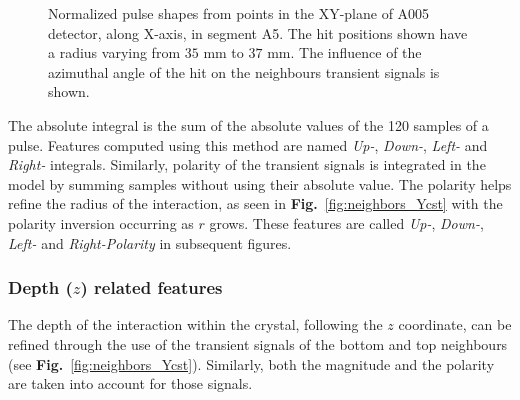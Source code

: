 \begin{figure}
\centering
{}
\caption{Normalized pulse shapes from points in the XY-plane
of A005 detector, along X-axis, in segment A5. The hit positions shown have a radius varying from $35$ mm to $37$ mm. The influence of the azimuthal angle of the hit on the neighbours transient signals is shown.}
\label{fig:neighbor_signals_RadCst}
\end{figure}

The absolute integral is the sum of the absolute values of the 120 samples of a pulse. Features computed using this method are named \textit{Up-}, \textit{Down-}, \textit{Left-} and \textit{Right-} integrals. Similarly, polarity of the transient signals is integrated in the model by summing samples without using their absolute value. The polarity helps refine the radius of the interaction, as seen in \textbf{Fig.}~\ref{fig:neighbors_Ycst} with the polarity inversion occurring as $r$ grows. These features are called \textit{Up-}, \textit{Down-}, \textit{Left-} and \textit{Right-Polarity} in subsequent figures.

\subsubsection{Depth ($z$) related features}
The depth of the interaction within the crystal, following the $z$ coordinate, can be refined through the use of the transient signals of the bottom and top neighbours (see \textbf{Fig.}~\ref{fig:neighbors_Ycst}). Similarly, both the magnitude and the polarity are taken into account for those signals.


